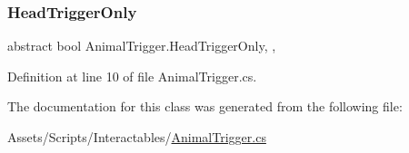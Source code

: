 \subsubsection{\texorpdfstring{Head\+Trigger\+Only}{HeadTriggerOnly}}
{\footnotesize\ttfamily abstract bool Animal\+Trigger.\+Head\+Trigger\+Only\hspace{0.3cm}{\ttfamily [get]}, {\ttfamily [set]}, {\ttfamily [protected]}}



Definition at line 10 of file Animal\+Trigger.\+cs.



The documentation for this class was generated from the following file\+:\begin{DoxyCompactItemize}
\item 
Assets/\+Scripts/\+Interactables/\mbox{\hyperlink{_animal_trigger_8cs}{Animal\+Trigger.\+cs}}\end{DoxyCompactItemize}

